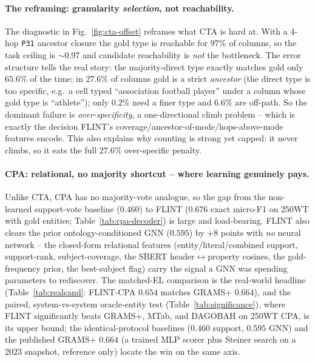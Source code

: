 \paragraph{The reframing: granularity \emph{selection}, not reachability.}
The diagnostic in Fig.~\ref{fig:cta-offset} reframes what CTA is hard at. With a
4-hop \texttt{P31} ancestor closure the gold type is reachable for $97\%$ of
columns, so the task ceiling is $\sim$0.97 and candidate reachability is \emph{not}
the bottleneck. The error structure tells the real story: the majority-direct type
exactly matches gold only $65.6\%$ of the time; in $27.6\%$ of columns gold is a
strict \emph{ancestor} (the direct type is too specific, e.g.\ a cell typed
``association football player'' under a column whose gold type is ``athlete''); only
$0.2\%$ need a finer type and $6.6\%$ are off-path. So the dominant failure is
\emph{over-specificity}, a one-directional climb problem -- which is exactly the
decision FLINT's coverage/ancestor-of-mode/hops-above-mode features encode. This
also explains why counting is strong yet capped: it never climbs, so it eats the
full $27.6\%$ over-specific penalty.

\paragraph{CPA: relational, no majority shortcut -- where learning genuinely pays.}
Unlike CTA, CPA has no majority-vote analogue, so the gap from the non-learned
support-vote baseline ($0.460$) to FLINT ($0.676$ exact micro-F1 on 250WT with gold
entities; Table~\ref{tab:cpa-decoder}) is large and load-bearing.
FLINT also clears the prior ontology-conditioned GNN ($0.595$) by $+8$ points with
\emph{no} neural network -- the closed-form relational features (entity/literal/combined
support, support-rank, subject-coverage, the SBERT header$\leftrightarrow$property
cosines, the gold-frequency prior, the best-subject flag) carry the signal a GNN was
spending parameters to rediscover. The matched-EL comparison is the real-world headline
(Table~\ref{tab:realcand}: FLINT-CPA $0.654$ matches GRAMS+ $0.664$), and the paired,
system-vs-system oracle-entity test (Table~\ref{tab:significance}), where FLINT
significantly beats GRAMS+, MTab, and DAGOBAH on 250WT CPA, is its upper bound; the identical-protocol baselines
($0.460$ support, $0.595$ GNN) and the published GRAMS+ $0.664$ (a trained MLP scorer
plus Steiner search on a 2023 snapshot, reference only) locate the win on the same axis.

